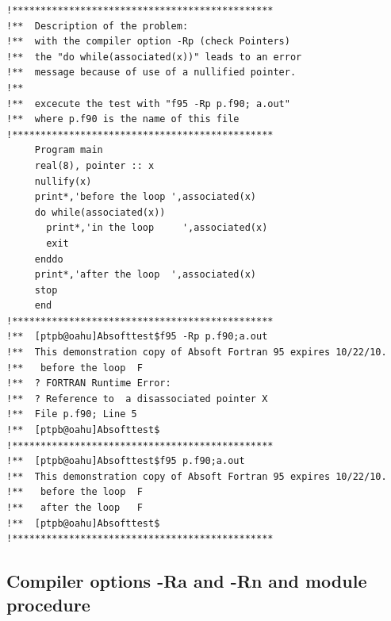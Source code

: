 \documentclass[a4paper,10pt]{report}
\begin{document}
\begin{verbatim}
!**********************************************
!**  Description of the problem:
!**  with the compiler option -Rp (check Pointers)
!**  the "do while(associated(x))" leads to an error
!**  message because of use of a nullified pointer.
!**
!**  excecute the test with "f95 -Rp p.f90; a.out"
!**  where p.f90 is the name of this file
!**********************************************
     Program main
     real(8), pointer :: x
     nullify(x)
     print*,'before the loop ',associated(x)
     do while(associated(x)) 
       print*,'in the loop     ',associated(x)
       exit
     enddo
     print*,'after the loop  ',associated(x)
     stop
     end
!**********************************************
!**  [ptpb@oahu]Absofttest$f95 -Rp p.f90;a.out
!**  This demonstration copy of Absoft Fortran 95 expires 10/22/10.
!**   before the loop  F
!**  ? FORTRAN Runtime Error:
!**  ? Reference to  a disassociated pointer X
!**  File p.f90; Line 5
!**  [ptpb@oahu]Absofttest$
!**********************************************
!**  [ptpb@oahu]Absofttest$f95 p.f90;a.out
!**  This demonstration copy of Absoft Fortran 95 expires 10/22/10.
!**   before the loop  F
!**   after the loop   F
!**  [ptpb@oahu]Absofttest$
!**********************************************
\end{verbatim}

\subsection{Compiler options -Ra and -Rn and module procedure}
\end{document}
